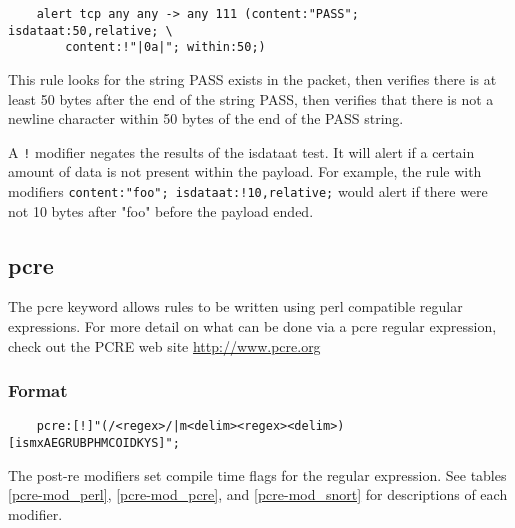 \documentclass[english]{report}
\begin{document}
\begin{verbatim}
    alert tcp any any -> any 111 (content:"PASS"; isdataat:50,relative; \ 
        content:!"|0a|"; within:50;)
\end{verbatim}

This rule looks for the string PASS exists in the packet, then verifies there
is at least 50 bytes after the end of the string PASS, then verifies that there
is not a newline character within 50 bytes of the end of the PASS string.

A \texttt{!} modifier negates the results of the isdataat test. It will alert 
if a certain amount of data is not present within the payload. For example,
the rule with modifiers \texttt{content:"foo"; isdataat:!10,relative;}  would 
alert if there were not 10 bytes after "foo" before the payload ended. 

\subsection{pcre}
\label{pcre}

The pcre keyword allows rules to be written using perl compatible regular
expressions.   For more detail on what can be done via a pcre regular
expression, check out the PCRE web site \url{http://www.pcre.org}

\subsubsection{Format}

\begin{verbatim}
    pcre:[!]"(/<regex>/|m<delim><regex><delim>)[ismxAEGRUBPHMCOIDKYS]";
\end{verbatim}

The post-re modifiers set compile time flags for the regular expression.  See tables
\ref{pcre-mod_perl}, \ref{pcre-mod_pcre}, and \ref{pcre-mod_snort} for descriptions
of each modifier.
\end{document}

